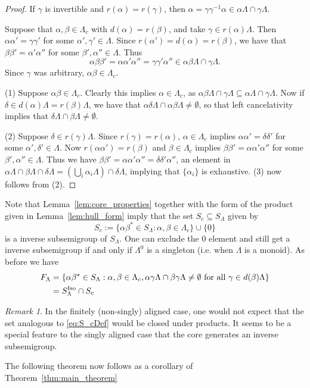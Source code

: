 \documentclass[12pt]{amsart}
\theoremstyle{definition}
\theoremstyle{remark}
\newtheorem{remark}[thm]{Remark}
\numberwithin{equation}{section}
\renewcommand{\L}{\Lambda}
\renewcommand{\a}{\alpha}
\renewcommand{\b}{\beta}
\newcommand{\Iso}{\textup{Iso}}
\newcommand{\ga}{\gamma}
\newcommand{\de}{\delta}
\begin{document}
\begin{proof}
	If $\ga$ is invertible and $r(\a) = r(\ga)$, then $\a = \ga\ga^{-1}\a \in \a\L\cap \gamma\L$. 
	
	Suppose that $\a,\beta\in \L_c$ with $d(\a) = r(\beta)$, and take $\gamma\in r(\a)\L$. Then $\a\a' = \gamma\gamma'$ for some $\a',\ga'\in \L$. Since $r(\a') = d(\a) = r(\b)$, we have that $\b\b' = \a'\a''$ for some $\b', \a''\in\L$. Thus
	\[
	\a\b\b' = \a\a'\a'' = \ga\ga'\a'' \in \a\b\L\cap \ga\L.
	\]
	Since $\gamma$ was arbitrary, $\a\b\in \L_c$.
	
	(1) Suppose $\a\b\in \L_c$. Clearly this implies $\a\in \L_c$, as $\a\b\L\cap \ga\L\subseteq \a\L\cap \gamma\L$. Now if $\delta\in d(\a)\L = r(\b)\L$, we have that $\a\de\L\cap \a\b\L \neq \emptyset$, so that left cancelativity implies that $\de\L\cap \b\L\neq \emptyset$. 
	
	(2) Suppose $\delta\in r(\gamma)\L$. Since $r(\gamma) = r(\a)$, $\a\in\L_c$ implies $\a\a' = \de\de'$ for some $\a', \de'\in \L$. Now $r(\a\a') = r(\b)$ and $\b\in\L_c$ implies $\b\b' = \a\a'\a''$ for some $\b', \a''\in\L$. Thus we have $\b\b' = \a\a'\a'' = \de\de'\a''$,  an element in $\a\L\cap\b\L\cap\de\L = \left(\bigcup_i\a_i\L\right)\cap \de\L$, implying that $\{\a_i\}$ is exhaustive. (3) now follows from (2).
	
\end{proof}
Note that Lemma~\ref{lem:core_properties} together with the form of the product given in Lemma~\ref{lem:hull_form} imply that the set $S_c\subseteq S_\L$ given by
\begin{equation}\label{eq:S_cDef}
	S_c:=\{\a\b^*\in S_\L : \a, \b\in\L_c\}\cup\{0\}
\end{equation}
is a inverse subsemigroup of $S_\L$. One can exclude the 0 element and still get a inverse subsemigroup if and only if $\L^0$ is a singleton (i.e. when $\L$ is a monoid). As before we have
\begin{align*}
	F_\L &= \{\a\b^*\in S_\L: \a,\b\in \L_c, \a\ga\L\cap\b\ga\L\neq \emptyset\text{ for all }\ga\in d(\b)\L\}\\
	& = S_\L^\Iso\cap S_c
\end{align*}
\begin{remark}
	In the finitely (non-singly) aligned case, one would not expect that the set analogous to \eqref{eq:S_cDef} would be closed under products. It seems to be a special feature to the singly aligned case that the core generates an inverse subsemigroup.
\end{remark}
The following theorem now follows as a corollary of Theorem~\ref{thm:main_theorem}
\end{document}
